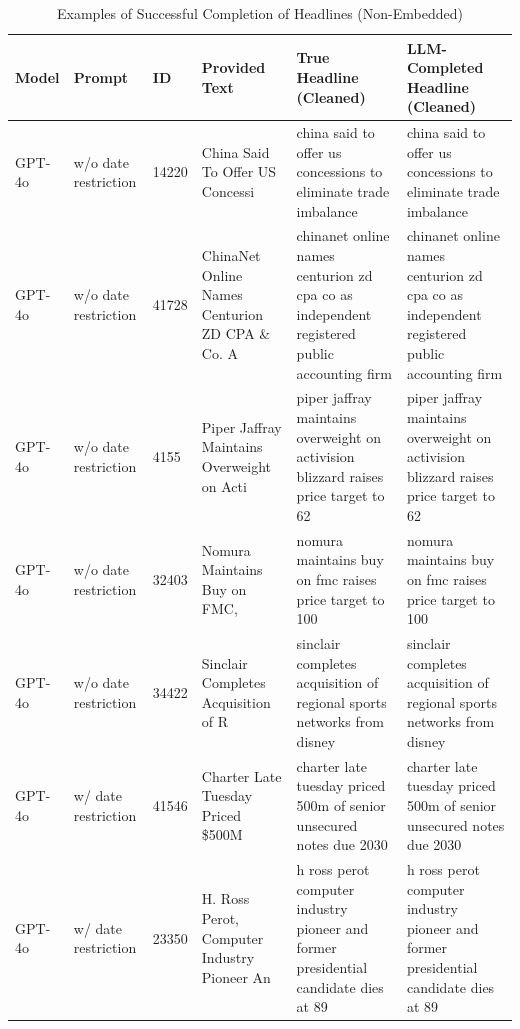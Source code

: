 \begin{table}[!h]
\centering
\caption{Examples of Successful Completion of Headlines (Non-Embedded)}
\centering
\begin{tabular}[t]{
p{1.4cm}
p{1.4cm}
p{1.4cm}
p{3.2cm}
p{3.2cm}
p{3.2cm}
}
\toprule
Model & Prompt & ID & Provided Text & True Headline (Cleaned) & LLM-Completed Headline (Cleaned)\\
\midrule
GPT-4o & w/o date restriction & 14220 & China Said To Offer US Concessi & china said to offer us concessions to eliminate trade imbalance & china said to offer us concessions to eliminate trade imbalance\\
\midrule
GPT-4o & w/o date restriction & 41728 & ChinaNet Online Names Centurion ZD CPA \& Co. A & chinanet online names centurion zd cpa co as independent registered public accounting firm & chinanet online names centurion zd cpa co as independent registered public accounting firm\\
\midrule
%
GPT-4o & w/o date restriction & 4155 & Piper Jaffray Maintains Overweight on Acti & piper jaffray maintains overweight on activision blizzard raises price target to 62 & piper jaffray maintains overweight on activision blizzard raises price target to 62\\
\midrule
GPT-4o & w/o date restriction & 32403 & Nomura Maintains Buy on FMC, & nomura maintains buy on fmc raises price target to 100 & nomura maintains buy on fmc raises price target to 100\\
\midrule
GPT-4o & w/o date restriction & 34422 & Sinclair Completes Acquisition of R & sinclair completes acquisition of regional sports networks from disney & sinclair completes acquisition of regional sports networks from disney\\
\midrule
GPT-4o & w/ date restriction & 41546 & Charter Late Tuesday Priced \$500M & charter late tuesday priced 500m of senior unsecured notes due 2030 & charter late tuesday priced 500m of senior unsecured notes due 2030\\
\midrule
%
GPT-4o & w/ date restriction & 23350 & H. Ross Perot, Computer Industry Pioneer An & h ross perot computer industry pioneer and former presidential candidate dies at 89 & h ross perot computer industry pioneer and former presidential candidate dies at 89\\
\midrule

\end{tabular}
\end{table}
